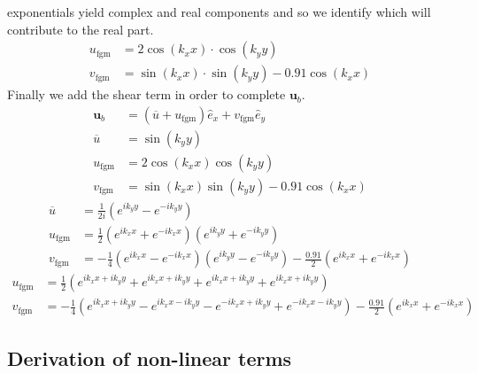 \documentclass{article} \usepackage{amsfonts,amsmath, amssymb, xcolor, amsthm,}
\begin{document}
        exponentials yield complex and real components and so we identify which
        will contribute to the real part.  
        \begin{align*} 
            u_{\text{fgm}} &= 2\cos(k_xx)\cdot\cos(k_yy) \\
            v_{\text{fgm}} &= \sin(k_xx)\cdot\sin(k_yy) - 0.91\cos(k_xx) 
        \end{align*} 
        Finally we add the shear term in order to complete $\bm{u}_b$.  
        \begin{align*} 
            \bm{u}_b &= (\overline{u} + u_{\text{fgm}})\hat{e}_x + 
            v_{\text{fgm}}\hat{e}_y \\
            \overline{u} &= \sin(k_yy) \\ u_{\text{fgm}} &= 
            2\cos(k_xx)\cos(k_yy) \\
            v_{\text{fgm}} &= \sin(k_xx)\sin(k_yy) - 0.91\cos(k_xx) 
        \end{align*}
        \begin{align*}
            \overline{u} &= \frac{1}{2i}\left(e^{ik_yy} - e^{-ik_yy}\right) \\ 
            u_{\text{fgm}} &= \frac{1}{2}\left(e^{ik_xx} + e^{-ik_xx}\right) 
            \left(e^{ik_yy} + e^{-ik_yy}\right)\\
            v_{\text{fgm}} &= -\frac{1}{4}\left(e^{ik_xx} - e^{-ik_xx}\right)
            \left(e^{ik_yy} - e^{-ik_yy}\right) - \frac{0.91}{2}\left(e^{ik_xx} +
            e^{-ik_xx}\right)
        \end{align*}
        \begin{align}
            u_{\text{fgm}} &= \frac{1}{2}\left(e^{ik_xx + ik_yy} + e^{ik_xx + 
            ik_yy} + e^{ik_xx + ik_yy} + e^{ik_xx + ik_yy}\right)\\
            v_{\text{fgm}} &= -\frac{1}{4}\left(e^{ik_xx + ik_yy} - 
            e^{ik_xx - ik_yy} - e^{-ik_xx + ik_yy} + e^{-ik_xx - ik_yy}\right) - 
            \frac{0.91}{2}\left(e^{ik_xx} + e^{-ik_xx}\right)
        \end{align}
    \newpage 
    \subsection{Derivation of non-linear terms}
\end{document}
